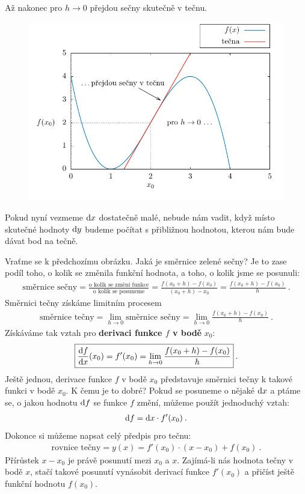 Až nakonec pro $h \rightarrow 0$ přejdou sečny skutečně v tečnu.

\begin{figure}[H]
    \centering
    \includegraphics{Gnuplot/cv8/Figures/tecna-graf.pdf}
\end{figure}

Pokud nyní vezmeme $\mathrm{d} x$ dostatečně malé, nebude nám vadit, když místo skutečné hodnoty $\mathrm{d} y$ budeme počítat s přibližnou hodnotou, kterou nám bude dávat bod na tečně.

Vraťme se k předchozímu obrázku. Jaká je směrnice zelené sečny? Je to zase podíl toho, o kolik se změnila funkční hodnota, a toho, o kolik jsme se posunuli:
\begin{align}
    \text{směrnice sečny} = \frac{\text{o kolik se změní funkce}}{\text{o kolik se posuneme}} = \frac{f(x_0+h)-f(x_0)}{(x_0+h)-x_0} = \frac{f(x_0+h)-f(x_0)}{h} \:.
\end{align}
Směrnici tečny získáme limitním procesem
\begin{align}
    \text{směrnice tečny} = \lim_{h \rightarrow 0} \text{směrnice sečny} = \lim_{h \rightarrow 0} \frac{f(x_0+h)-f(x_0)}{h} \:.
\end{align}
Získáváme tak vztah pro \textbf{derivaci funkce $f$ v bodě} $x_0$:
\begin{align}
    \boxed{\frac{\mathrm{d} f}{\mathrm{d} x} (x_0) = f'(x_0) = \lim_{h \rightarrow 0} \frac{f(x_0+h)-f(x_0)}{h}} \:.
\end{align}
Ještě jednou, derivace funkce $f$ v bodě $x_0$ představuje směrnici tečny k takové funkci v bodě $x_0$. K čemu je to dobré? Pokud se posuneme o nějaké $\mathrm{d} x$ a ptáme se, o jakou hodnotu $\mathrm{d} f$ se funkce $f$ změní, můžeme použít jednoduchý vztah:
\begin{align}
    \mathrm{d} f = \mathrm{d} x \cdot f'(x_0) \:.
\end{align}
Dokonce si můžeme napsat celý předpis pro tečnu:
\begin{align}
    \text{rovnice tečny} = y(x) = f'(x_0) \cdot (x-x_0) + f(x_0) \:.
\end{align}
Přírůstek $x-x_0$ je právě posunutí mezi $x_0$ a $x$. Zajímá-li nás hodnota tečny v bodě $x$, stačí takové posunutí vynásobit derivací funkce $f'(x_0)$ a přičíst ještě funkční hodnotu $f(x_0)$.

